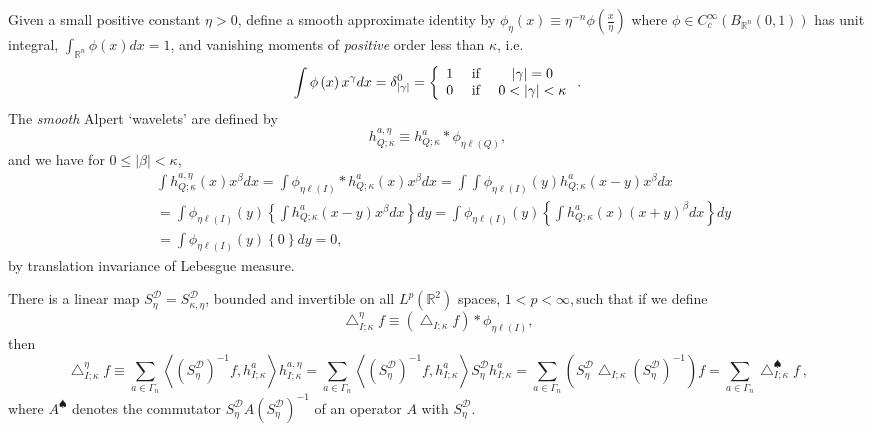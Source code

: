\documentclass{amsart}%
\theoremstyle{plain}
\numberwithin{equation}{section}
\begin{document}
Given a small positive constant $\eta>0$, define a smooth approximate identity
by $\phi_{\eta}\left(  x\right)  \equiv\eta^{-n}\phi\left(  \frac{x}{\eta
}\right)  $ where $\phi\in C_{c}^{\infty}\left(  B_{\mathbb{R}^{n}}\left(
0,1\right)  \right)  $ has unit integral, $\int_{\mathbb{R}^{n}}\phi\left(
x\right)  dx=1$, and vanishing moments of \emph{positive} order less than
$\kappa$, i.e.
\begin{equation}
\int\phi\left(  x\right)  x^{\gamma}dx=\delta_{\left\vert \gamma\right\vert
}^{0}=\left\{
\begin{array}
[c]{ccc}%
1 & \text{ if } & \left\vert \gamma\right\vert =0\\
0 & \text{ if } & 0<\left\vert \gamma\right\vert <\kappa
\end{array}
\right.  .\label{van pos}%
\end{equation}
The \emph{smooth} Alpert `wavelets' are defined by%
\[
h_{Q;\kappa}^{a,\eta}\equiv h_{Q;\kappa}^{a}\ast\phi_{\eta\ell\left(
Q\right)  },
\]
and we have for $0\leq\left\vert \beta\right\vert <\kappa$,%
\begin{align*}
&  \int h_{Q;\kappa}^{a,\eta}\left(  x\right)  x^{\beta}dx=\int\phi_{\eta
\ell\left(  I\right)  }\ast h_{Q;\kappa}^{a}\left(  x\right)  x^{\beta}%
dx=\int\int\phi_{\eta\ell\left(  I\right)  }\left(  y\right)  h_{Q;\kappa}%
^{a}\left(  x-y\right)  x^{\beta}dx\\
&  =\int\phi_{\eta\ell\left(  I\right)  }\left(  y\right)  \left\{  \int
h_{Q;\kappa}^{a}\left(  x-y\right)  x^{\beta}dx\right\}  dy=\int\phi_{\eta
\ell\left(  I\right)  }\left(  y\right)  \left\{  \int h_{Q;\kappa}^{a}\left(
x\right)  \left(  x+y\right)  ^{\beta}dx\right\}  dy\\
&  =\int\phi_{\eta\ell\left(  I\right)  }\left(  y\right)  \left\{  0\right\}
dy=0,
\end{align*}
by translation invariance of Lebesgue measure.

There is a linear map $S_{\eta}^{\mathcal{D}}=S_{\kappa,\eta}^{\mathcal{D}}$,
bounded and invertible on all $L^{p}\left(  \mathbb{R}^{2}\right)  $ spaces,
$1<p<\infty$,$\,$such that if we define%
\[
\bigtriangleup_{I;\kappa}^{\eta}f\equiv\left(  \bigtriangleup_{I;\kappa
}f\right)  \ast\phi_{\eta\ell\left(  I\right)  },
\]
then%
\[
\bigtriangleup_{I;\kappa}^{\eta}f\equiv\sum_{a\in\Gamma_{n}}\left\langle
\left(  S_{\eta}^{\mathcal{D}}\right)  ^{-1}f,h_{I;\kappa}^{a}\right\rangle
h_{I;\kappa}^{a,\eta}=\sum_{a\in\Gamma_{n}}\left\langle \left(  S_{\eta
}^{\mathcal{D}}\right)  ^{-1}f,h_{I;\kappa}^{a}\right\rangle S_{\eta
}^{\mathcal{D}}h_{I;\kappa}^{a}=\sum_{a\in\Gamma_{n}}\left(  S_{\eta
}^{\mathcal{D}}\bigtriangleup_{I;\kappa}\left(  S_{\eta}^{\mathcal{D}}\right)
^{-1}\right)  f=\sum_{a\in\Gamma_{n}}\bigtriangleup_{I;\kappa}^{\spadesuit
}f\ ,
\]
where $A^{\spadesuit}$ denotes the commutator $S_{\eta}^{\mathcal{D}}A\left(
S_{\eta}^{\mathcal{D}}\right)  ^{-1}$ of an operator $A$ with $S_{\eta
}^{\mathcal{D}}$.
\end{document}
